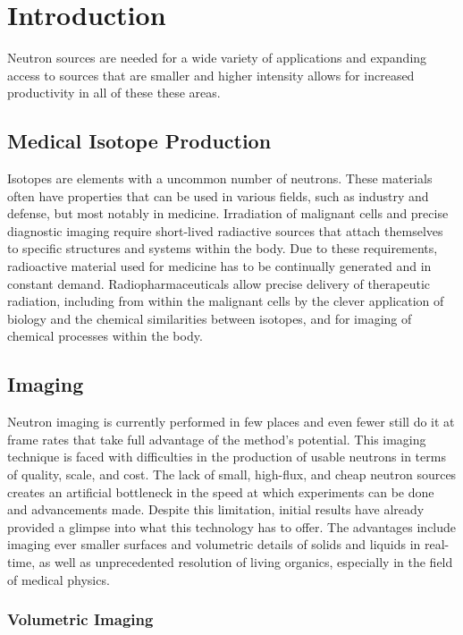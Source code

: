 \setcounter{page}{1}
\section{Introduction}
\label{sec:introduction}

Neutron sources are needed for a wide variety of applications and expanding access to sources that are smaller and higher intensity allows for increased productivity in all of these these areas.

\subsection{Medical Isotope Production}

Isotopes are elements with a uncommon number of neutrons. These materials often have properties that can be used in various fields, such as industry and defense, but most notably in medicine. Irradiation of malignant cells and precise diagnostic imaging require short-lived radiactive sources that attach themselves to specific structures and systems within the body. Due to these requirements, radioactive material used for medicine has to be continually generated and in constant demand. Radiopharmaceuticals allow precise delivery of therapeutic radiation, including from within the malignant cells by the clever application of biology and the chemical similarities between isotopes, and for imaging of chemical processes within the body.

\subsection{Imaging}

Neutron imaging is currently performed in few places and even fewer still do it at frame rates that take full advantage of the method's potential. This imaging technique is faced with difficulties in the production of usable neutrons in terms of quality, scale, and cost. The lack of small, high-flux, and cheap neutron sources creates an artificial bottleneck in the speed at which experiments can be done and advancements made. Despite this limitation, initial results have already provided a glimpse into what this technology has to offer. The advantages include imaging ever smaller surfaces and volumetric details of solids and liquids in real-time, as well as unprecedented resolution of living organics, especially in the field of medical physics.

\subsubsection{Volumetric Imaging}

